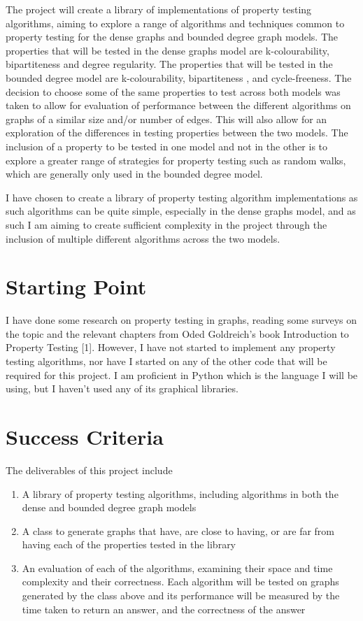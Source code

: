 \documentclass[11pt,a4paper]{article}
\begin{document}
The project will create a library of implementations of property testing algorithms, aiming to explore a range of algorithms and techniques common to property testing for the dense graphs and bounded degree graph models. The properties that will be tested in the dense graphs model are k-colourability, bipartiteness and degree regularity. \cite{goldreich} The properties that will be tested in the bounded degree model are k-colourability, bipartiteness \cite{Ron}, and cycle-freeness. The decision to choose some of the same properties to test across both models was taken to allow for evaluation of performance between the different algorithms on graphs of a similar size and/or number of edges. This will also allow for an exploration of the differences in testing properties between the two models. The inclusion of a property to be tested in one model and not in the other is to explore a greater range of strategies for property testing such as random walks, which are generally only used in the bounded degree model. 

I have chosen to create a library of property testing algorithm implementations as such algorithms can be quite simple, especially in the dense graphs model, and as such I am aiming to create sufficient complexity in the project through the inclusion of multiple different algorithms across the two models.

\section{Starting Point}
I have done some research on property testing in graphs, reading some surveys on the topic and the relevant chapters from Oded Goldreich’s book Introduction to Property Testing [1]. However, I have not started to implement any property testing algorithms, nor have I started on any of the other code that will be required for this project. I am proficient in Python which is the language I will be using, but I haven’t used any of its graphical libraries.

\section{Success Criteria}
The deliverables of this project include
\begin{enumerate}
    \item A library of property testing algorithms, including algorithms in both the dense and bounded degree graph models
    \item A class to generate graphs that have, are close to having, or are far from having each of the properties tested in the library
    \item An evaluation of each of the algorithms, examining their space and time complexity and their correctness. Each algorithm will be tested on graphs generated by the class above and its performance will be measured by the time taken to return an answer, and the correctness of the answer
\end{enumerate}
\end{document}
